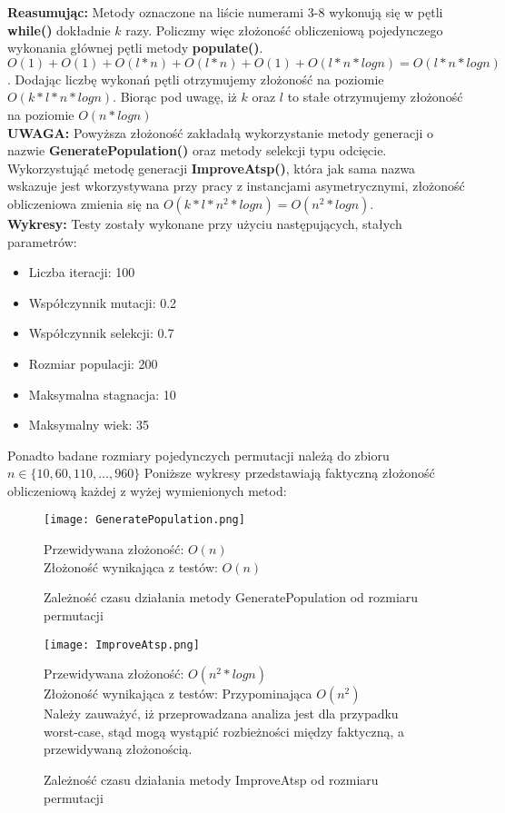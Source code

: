   \textbf{Reasumując: } Metody oznaczone na liście numerami 3-8 wykonują się w pętli \textbf{while()} dokładnie $k$ razy. Policzmy więc złożoność obliczeniową pojedynczego wykonania głównej pętli metody \textbf{populate()}. \\
  $O(1) + O(1) + O(l*n) + O(l*n)  + O(1) + O(l*n*logn) = O(l*n*logn)$. Dodając liczbę wykonań pętli otrzymujemy złożoność na poziomie $O(k*l*n*logn)$. Biorąc pod uwagę, iż $k$ oraz $l$ to stałe otrzymujemy złożoność na poziomie $O(n*logn)$\\
  \textbf{UWAGA:} Powyższa złożoność zakładałą wykorzystanie metody generacji o nazwie \textbf{GeneratePopulation()} oraz metody selekcji typu odcięcie. Wykorzystująć metodę generacji \textbf{ImproveAtsp()}, która jak sama nazwa wskazuje jest wkorzystywana przy pracy z instancjami asymetrycznymi,
  złożoność obliczeniowa zmienia się na $O(k*l*n^{2}*logn) = O(n^{2}*logn)$. \\
  \textbf{Wykresy:}
  Testy zostały wykonane przy użyciu następujących, stałych parametrów:
  \begin{itemize}
    \item Liczba iteracji: 100
    \item Współczynnik mutacji: 0.2
    \item Współczynnik selekcji: 0.7
    \item Rozmiar populacji: 200
    \item Maksymalna stagnacja: 10
    \item Maksymalny wiek: 35
  \end{itemize}
  Ponadto badane rozmiary pojedynczych permutacji należą do zbioru $n \in \{10,60,110,...,960\}$
  Poniższe wykresy przedstawiają faktyczną złożoność obliczeniową każdej z wyżej wymienionych metod:
  \begin{figure}[H]
    \texttt{[image: GeneratePopulation.png]}
    \centering
    \caption{Zależność czasu działania metody GeneratePopulation od rozmiaru permutacji}
    Przewidywana złożoność: $O(n)$ \\
    Złożoność wynikająca z testów: $O(n)$ \\
  \end{figure}
  \begin{figure}[H]
    \texttt{[image: ImproveAtsp.png]}
    \centering
    \caption{Zależność czasu działania metody ImproveAtsp od rozmiaru permutacji}
    Przewidywana złożoność: $O(n^2*logn)$ \\
    Złożoność wynikająca z testów: Przypominająca $O(n^2)$ \\
    Należy zauważyć, iż przeprowadzana analiza jest dla przypadku worst-case, stąd mogą wystąpić rozbieżności między faktyczną, a przewidywaną złożonością.
  \end{figure}
